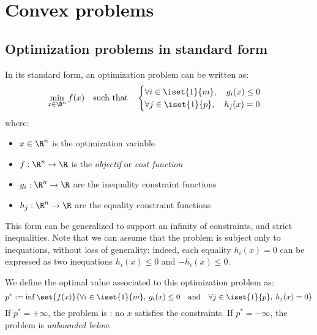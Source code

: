 \section{Convex problems}
\subsection{Optimization problems in standard form}
\begin{definition}
    In its standard form, an optimization problem can be written as:
    \begin{equation*}
        \min_{x\in\R^n} f(x) \quad\text{such that}\quad \begin{cases}
            \forall i\in\iset{1}{m}, \quad g_i(x)\leq 0\\
            \forall j\in\iset{1}{p}, \quad h_j(x) = 0
        \end{cases}
    \end{equation*}
    where:
    \begin{itemize}
        \item $x\in\R^n$ is the optimization variable
        \item $f:\R^n\to\R$ is the \emph{objectif} or \emph{cost function}
        \item $g_i:\R^n\to\R$ are the inequality constraint functions
        \item $h_j:\R^n\to\R$ are the equality constraint functions
    \end{itemize}
\end{definition}
\begin{remark}
    This form can be generalized to support an infinity of constraints, and strict inequalities. Note that we can assume that the problem is subject only to inequations, without loss of generality: indeed, each equality $h_i(x)=0$ can be expressed as two inequations $h_i(x)\leq0$ and $-h_i(x)\leq0$.
\end{remark}

\begin{definition}
    We define the optimal value associated to this optimization problem as:
    \begin{equation*}
        p^* := \inf\set{f(x)}{\forall i\in\iset{1}{m}, \: g_i(x)\leq 0 \quad\text{and}\quad \forall j\in\iset{1}{p}, \: h_j(x) = 0}
    \end{equation*}
    If $p^*=+\infty$, the problem is : no $x$ satisfies the constraints. If $p^*=-\infty$, the problem is \emph{unbounded below}.
\end{definition}
